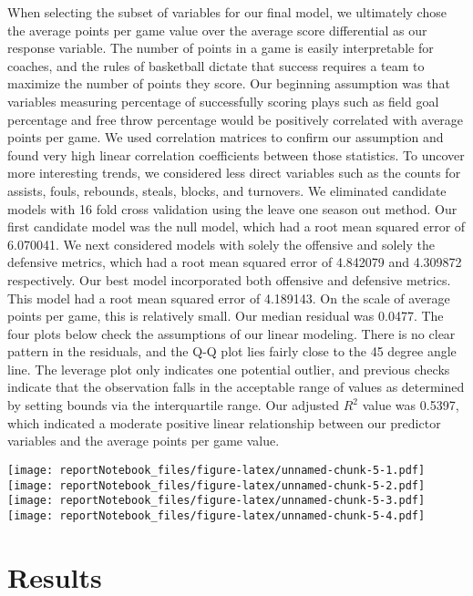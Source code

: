 \documentclass[
]{article}
\begin{document}
When selecting the subset of variables for our final model, we
ultimately chose the average points per game value over the average
score differential as our response variable. The number of points in a
game is easily interpretable for coaches, and the rules of basketball
dictate that success requires a team to maximize the number of points
they score. Our beginning assumption was that variables measuring
percentage of successfully scoring plays such as field goal percentage
and free throw percentage would be positively correlated with average
points per game. We used correlation matrices to confirm our assumption
and found very high linear correlation coefficients between those
statistics. To uncover more interesting trends, we considered less
direct variables such as the counts for assists, fouls, rebounds,
steals, blocks, and turnovers. We eliminated candidate models with 16
fold cross validation using the leave one season out method. Our first
candidate model was the null model, which had a root mean squared error
of 6.070041. We next considered models with solely the offensive and
solely the defensive metrics, which had a root mean squared error of
4.842079 and 4.309872 respectively. Our best model incorporated both
offensive and defensive metrics. This model had a root mean squared
error of 4.189143. On the scale of average points per game, this is
relatively small. Our median residual was 0.0477. The four plots below
check the assumptions of our linear modeling. There is no clear pattern
in the residuals, and the Q-Q plot lies fairly close to the 45 degree
angle line. The leverage plot only indicates one potential outlier, and
previous checks indicate that the observation falls in the acceptable
range of values as determined by setting bounds via the interquartile
range. Our adjusted \(R^2\) value was 0.5397, which indicated a moderate
positive linear relationship between our predictor variables and the
average points per game value.

\texttt{[image: reportNotebook\_files/figure-latex/unnamed-chunk-5-1.pdf]}
\texttt{[image: reportNotebook\_files/figure-latex/unnamed-chunk-5-2.pdf]}
\texttt{[image: reportNotebook\_files/figure-latex/unnamed-chunk-5-3.pdf]}
\texttt{[image: reportNotebook\_files/figure-latex/unnamed-chunk-5-4.pdf]}

\hypertarget{results}{%
\section{Results}\label{results}}
\end{document}
